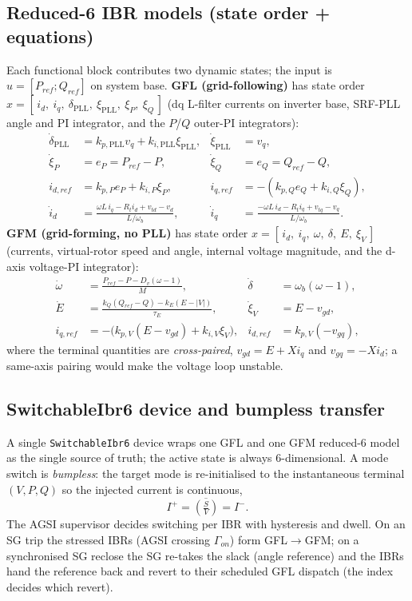 \documentclass[12pt,a4paper]{article}
\begin{document}
\subsection{Reduced-6 IBR models (state order + equations)}
Each functional block contributes two dynamic states; the input is $u=[P_{ref};Q_{ref}]$ on
system base. \textbf{GFL (grid-following)} has state order
$x=[\,i_d,\ i_q,\ \delta_{\mathrm{PLL}},\ \xi_{\mathrm{PLL}},\ \xi_P,\ \xi_Q\,]$ (dq L-filter
currents on inverter base, SRF-PLL angle and PI integrator, and the $P$/$Q$ outer-PI integrators):
\begin{align}
\dot{\delta}_{\mathrm{PLL}} &= k_{p,\mathrm{PLL}}v_q + k_{i,\mathrm{PLL}}\xi_{\mathrm{PLL}}, &
\dot{\xi}_{\mathrm{PLL}} &= v_q,\\
\dot{\xi}_P &= e_P = P_{ref}-P, & \dot{\xi}_Q &= e_Q = Q_{ref}-Q,\\
i_{d,ref} &= k_{p,P}e_P + k_{i,P}\xi_P, & i_{q,ref} &= -(k_{p,Q}e_Q + k_{i,Q}\xi_Q),\\
\dot{i}_d &= \frac{\omega L\, i_q - R_t i_d + v_{td} - v_d}{L/\omega_b}, &
\dot{i}_q &= \frac{-\omega L\, i_d - R_t i_q + v_{tq} - v_q}{L/\omega_b}.
\end{align}
\textbf{GFM (grid-forming, no PLL)} has state order
$x=[\,i_d,\ i_q,\ \omega,\ \delta,\ E,\ \xi_V\,]$ (currents, virtual-rotor speed and angle,
internal voltage magnitude, and the d-axis voltage-PI integrator):
\begin{align}
\dot{\omega} &= \frac{P_{ref}-P-D_v(\omega-1)}{M}, & \dot{\delta} &= \omega_b(\omega-1),\\
\dot{E} &= \frac{k_Q(Q_{ref}-Q)-k_E(E-|V|)}{\tau_E}, & \dot{\xi}_V &= E - v_{gd},\\
i_{q,ref} &= -\big(k_{p,V}(E-v_{gd})+k_{i,V}\xi_V\big), & i_{d,ref} &= k_{p,V}(-v_{gq}),
\end{align}
where the terminal quantities are \emph{cross-paired}, $v_{gd}=E+X i_q$ and $v_{gq}=-X i_d$; a
same-axis pairing would make the voltage loop unstable.

\subsection{SwitchableIbr6 device and bumpless transfer}
A single \texttt{SwitchableIbr6} device wraps one GFL and one GFM reduced-6 model as the single
source of truth; the active state is always 6-dimensional. A mode switch is \emph{bumpless}: the
target mode is re-initialised to the instantaneous terminal $(V,P,Q)$ so the injected current is
continuous,
\begin{equation}
I^{+} = \overline{\left(\tfrac{S}{V}\right)} = I^{-}.
\end{equation}
The AGSI supervisor decides switching per IBR with hysteresis and dwell. On an SG trip the
stressed IBRs (AGSI crossing $\Gamma_{on}$) form GFL$\to$GFM; on a synchronised SG reclose the SG
re-takes the slack (angle reference) and the IBRs hand the reference back and revert to their
scheduled GFL dispatch (the index decides which revert).
\end{document}
